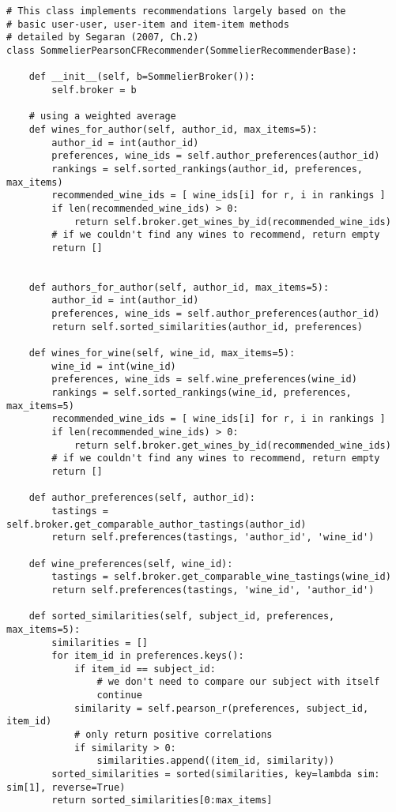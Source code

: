 \begin{verbatim}
# This class implements recommendations largely based on the 
# basic user-user, user-item and item-item methods
# detailed by Segaran (2007, Ch.2)
class SommelierPearsonCFRecommender(SommelierRecommenderBase):

    def __init__(self, b=SommelierBroker()):
        self.broker = b

    # using a weighted average
    def wines_for_author(self, author_id, max_items=5):
        author_id = int(author_id)
        preferences, wine_ids = self.author_preferences(author_id)
        rankings = self.sorted_rankings(author_id, preferences, max_items)
        recommended_wine_ids = [ wine_ids[i] for r, i in rankings ]
        if len(recommended_wine_ids) > 0:
            return self.broker.get_wines_by_id(recommended_wine_ids)
        # if we couldn't find any wines to recommend, return empty
        return []
        

    def authors_for_author(self, author_id, max_items=5):
        author_id = int(author_id)
        preferences, wine_ids = self.author_preferences(author_id)
        return self.sorted_similarities(author_id, preferences)

    def wines_for_wine(self, wine_id, max_items=5):
        wine_id = int(wine_id)
        preferences, wine_ids = self.wine_preferences(wine_id)
        rankings = self.sorted_rankings(wine_id, preferences, max_items=5)
        recommended_wine_ids = [ wine_ids[i] for r, i in rankings ]
        if len(recommended_wine_ids) > 0:
            return self.broker.get_wines_by_id(recommended_wine_ids)
        # if we couldn't find any wines to recommend, return empty
        return []

    def author_preferences(self, author_id):
        tastings = self.broker.get_comparable_author_tastings(author_id)
        return self.preferences(tastings, 'author_id', 'wine_id')

    def wine_preferences(self, wine_id):
        tastings = self.broker.get_comparable_wine_tastings(wine_id)
        return self.preferences(tastings, 'wine_id', 'author_id')

    def sorted_similarities(self, subject_id, preferences, max_items=5):
        similarities = []
        for item_id in preferences.keys():
            if item_id == subject_id:
                # we don't need to compare our subject with itself
                continue
            similarity = self.pearson_r(preferences, subject_id, item_id)
            # only return positive correlations
            if similarity > 0:
                similarities.append((item_id, similarity))
        sorted_similarities = sorted(similarities, key=lambda sim: sim[1], reverse=True)
        return sorted_similarities[0:max_items]


\end{verbatim}
